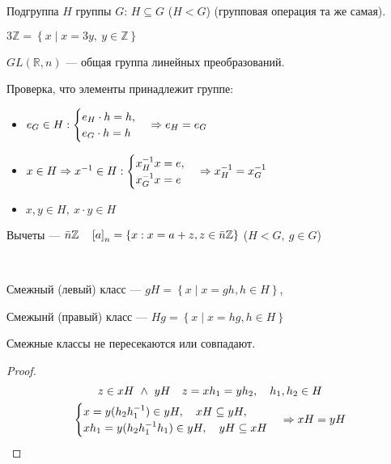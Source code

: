 \begin{definition}
    Подгруппа $H$ группы $G$: $H \subseteq G$ ($H < G$) (групповая операция та же самая).
\end{definition}

\begin{example}
    $3 \mathbb{Z}  = \left\{ x \mid x = 3y,\  y \in \mathbb{Z} \right\}$
\end{example}

\begin{definition}
    $GL(\mathbb{R}, n)$ --- общая группа линейных преобразований.
\end{definition}


Проверка, что элементы принадлежит группе:
\begin{itemize}
    \item[\text{$\left. 1 \right)$}] $e_G \in H: \begin{cases} e_H \cdot h = h, \\ e_G \cdot h = h \end{cases} \Rightarrow e_H = e_G$
    \item[\text{$\left. 2 \right)$}] $x \in H \Rightarrow x ^ {-1} \in H: \begin{cases} x_H^{-1} x = e, \\ x_G^{-1} x = e \end{cases} \Rightarrow x_H^{-1} = x_G^{-1}$
    \item[\text{$\left. 3 \right)$}] $x, y \in H, \  x \cdot y \in H$
\end{itemize}

\begin{reminder}
    Вычеты --- $\bar{n} \mathbb{Z} \quad \left[a \right]_n = \left\{ x: x = a + z, z \in \bar n \mathbb{Z} \right\}$ ($H < G, \ g \in G$)
\end{reminder}

\begin{definition}
    ~

    Смежный (левый) класс --- $gH = \left\{x \mid x = gh, h \in H\right\}$,
    
    Смежынй (правый) класс --- $Hg = \left\{x \mid x = hg, h \in H\right\}$
\end{definition}

\begin{lemma}
    Смежные классы не пересекаются или совпадают.
\end{lemma}
\begin{proof}
    \begin{gather}
        z \in xH \  \land \  yH \quad z = x h_1 = y h_2, \quad h_1, h_2 \in H \\
        \begin{cases} x = y(h_2h_1^{-1}) \in yH, \quad xH \subseteq yH, \\
        xh_1 = y (h_2h_1^{-1}h_1) \in yH, \quad yH \subseteq xH \end{cases} \Rightarrow xH = yH
    \end{gather}
\end{proof}

